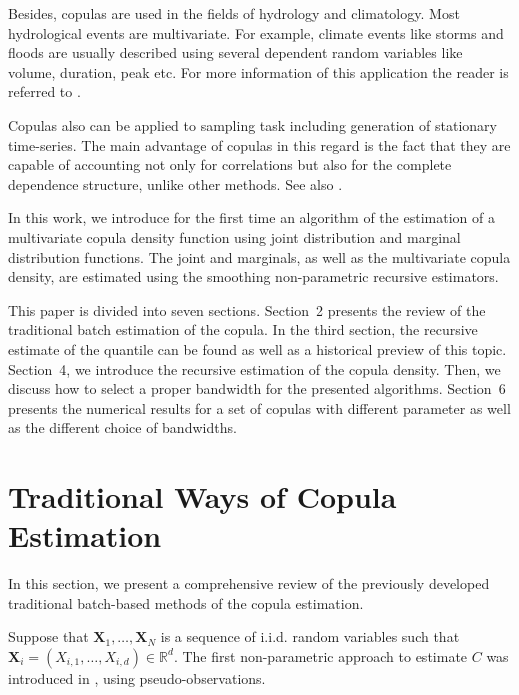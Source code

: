 \documentclass[12pt]{article}
\begin{document}
	Besides, copulas are used in the fields of hydrology and climatology. Most hydrological events are multivariate. For example, climate events like storms and floods are usually described using several dependent random variables like volume, duration, peak etc. For more information of this application the reader is referred to \parencite{Favre2004,Genest2007,Renard2007,Chu2011,Dempster2007,Friedman2010,Piantadosi2012a,Piantadosi2012b,Salvadori2007}.
	
	Copulas also can be applied to sampling task including generation of stationary time-series. The main advantage of copulas in this regard is the fact that they are capable of accounting not only for correlations but also for the complete dependence structure, unlike other methods. See also \parencite{Strelen2009,Strelen2007,Erhardt2010,Erhardt2012,Nelsen2007,Matthias2017,Hyrs2015}.
	
	In this work, we introduce for the first time an algorithm of the estimation of a multivariate copula density function using joint distribution and marginal distribution functions. The joint and marginals, as well as the multivariate copula density, are estimated using the smoothing non-parametric recursive estimators.
	
	This paper is divided into seven sections. Section~2 presents the review of the traditional batch estimation of the copula. In the third section, the recursive estimate of the quantile can be found as well as a historical preview of this topic. Section~4, we introduce the recursive estimation of the copula density. Then, we discuss how to select a proper bandwidth for the presented algorithms. Section~6 presents the numerical results for a set of copulas with different parameter as well as the different choice of bandwidths.
	
	\section{Traditional Ways of Copula Estimation}\label{sec:traditional}
	
	In this section, we present a comprehensive review of the previously developed traditional batch-based methods of the copula estimation. 	
	
	Suppose that $ \mathbf{X}_1, \dots, \mathbf{X}_N $ is a sequence of i.i.d. random variables such that $ \mathbf{X}_i = (X_{i, 1}, \dots, X_{i, d}) \in \mathbb{R}^d $. The first non-parametric approach to estimate $ C $ was introduced in \textcite{Ruschendorf1976}, using pseudo-observations.
	
\end{document}
